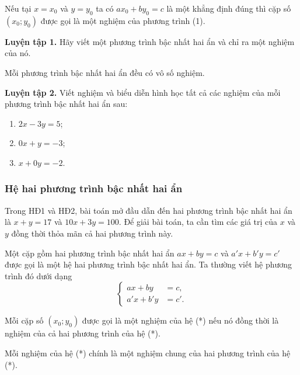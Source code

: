 \begin{lesson}
\begin{keyconcept}
        Nếu tại $x=x_0$ và $y=y_0$ ta có $ax_0+by_0=c$ là một khẳng định đúng thì cặp số $(x_0;y_0)$ được gọi là một nghiệm của phương trình (1).
    \end{keyconcept}

    \textbf{Luyện tập 1.} Hãy viết một phương trình bậc nhất hai ẩn và chỉ ra một nghiệm của nó.

    \answerline
    \answerline

    \begin{keyconcept}
        Mỗi phương trình bậc nhất hai ẩn đều có vô số nghiệm.
    \end{keyconcept}

    \textbf{Luyện tập 2.} Viết nghiệm và biểu diễn hình học tất cả các nghiệm của mỗi phương trình bậc nhất hai ẩn sau:
    \begin{enumerate}[label=\alph*)]
        \item $2x-3y=5$;
        \item $0x+y=-3$;
        \item $x+0y=-2$.
    \end{enumerate}

    \answerline
    \answerline
    \answerline

    \subsubsection{Hệ hai phương trình bậc nhất hai ẩn}

    Trong HĐ1 và HĐ2, bài toán mở đầu dẫn đến hai phương trình bậc nhất hai ẩn là $x+y=17$ và $10x+3y=100$. Để giải bài toán, ta cần tìm các giá trị của $x$ và $y$ đồng thời thỏa mãn cả hai phương trình này.

    \begin{keyconcept}
        Một cặp gồm hai phương trình bậc nhất hai ẩn $ax+by=c$ và $a'x+b'y=c'$ được gọi là một hệ hai phương trình bậc nhất hai ẩn. Ta thường viết hệ phương trình đó dưới dạng
        \[
            \left\{
            \begin{aligned}
                ax+by&=c,\\
                a'x+b'y&=c'.
            \end{aligned}
            \right. \tag{*}
        \]

        Mỗi cặp số $(x_0;y_0)$ được gọi là một nghiệm của hệ (*) nếu nó đồng thời là nghiệm của cả hai phương trình của hệ (*).

        Mỗi nghiệm của hệ (*) chính là một nghiệm chung của hai phương trình của hệ (*).
    \end{keyconcept}


\end{lesson}

